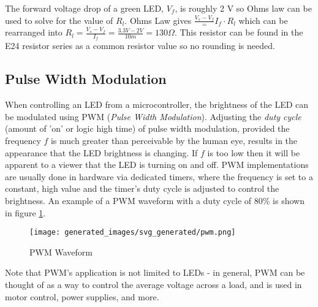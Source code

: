\documentclass[main.tex]{subfiles}
\begin{document}
The forward voltage drop of a green LED, $V_f$, is roughly 2 V so Ohms law can be used to solve for the value of $R_l$. Ohms Law gives $\frac{V_s - V_f} = I_f \cdot R_l$ which can be rearranged into $R_l = \frac{V_s - V_f}{I_f} = \frac{3.3V-2V}{10m} = 130 \Omega$. This resistor can be found in the E24 resistor series as a common resistor value so no rounding is needed. 

\subsection{Pulse Width Modulation}
When controlling an LED from a microcontroller, the brightness of the LED can be modulated using PWM (\textit{Pulse Width Modulation}). Adjusting the \textit{duty cycle} (amount of 'on' or logic high time) of pulse width modulation, provided the frequency $f$ is much greater than perceivable by the human eye, results in the appearance that the LED brightness is changing. If $f$ is too low then it will be apparent to a viewer that the LED is turning on and off. PWM implementations are usually done in hardware via dedicated timers, where the frequency is set to a constant, high value and the timer's duty cycle is adjusted to control the brightness. An example of a PWM waveform with a duty cycle of 80\% is shown in figure \ref{fig:pwm_waveform}.

\begin{figure}[H]
    \centering
    \texttt{[image: generated\_images/svg\_generated/pwm.png]}
    \caption{PWM Waveform}
    \label{fig:pwm_waveform}
\end{figure}

\noindent Note that PWM's application is not limited to LEDs - in general, PWM can be thought of as a way to control the average voltage across a load, and is used in motor control, power supplies, and more.
\end{document}
